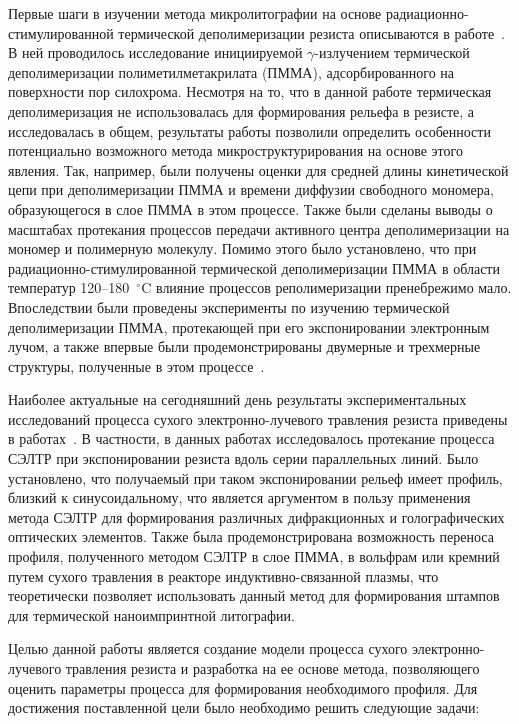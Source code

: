 \previouswork

Первые шаги в изучении метода микролитографии на основе радиационно-стимулированной термической деполимеризации резиста описываются в работе~\cite{Bruk_2000}.
В ней проводилось исследование инициируемой $\gamma$-излучением термической деполимеризации полиметилметакрилата (ПММА), адсорбированного на поверхности пор силохрома.
Несмотря на то, что в данной работе термическая деполимеризация не использовалась для формирования рельефа в резисте, а исследовалась в общем, результаты работы позволили определить особенности потенциально возможного метода микроструктурирования на основе этого явления.
Так, например, были получены оценки для средней длины кинетической цепи при деполимеризации ПММА и времени диффузии свободного мономера, образующегося в слое ПММА в этом процессе.
Также были сделаны выводы о масштабах протекания процессов передачи активного центра деполимеризации на мономер и полимерную молекулу.
Помимо этого было установлено, что при радиационно-стимулированной термической деполимеризации ПММА в области температур 120--180~$^\circ$C влияние процессов реполимеризации пренебрежимо мало.
Впоследствии были проведены эксперименты по изучению термической деполимеризации ПММА, протекающей при его экспонировании электронным лучом, а также впервые были продемонстрированы двумерные и трехмерные структуры, полученные в этом процессе~\cite{Bruk_2013}.

Наиболее актуальные на сегодняшний день результаты экспериментальных исследований процесса сухого электронно-лучевого травления резиста приведены в работах~\cite{Bruk_2015_co, Bruk_2016_mee}.
В частности, в данных работах исследовалось протекание процесса СЭЛТР при экспонировании резиста вдоль серии параллельных линий.
Было установлено, что получаемый при таком экспонировании рельеф имеет профиль, близкий к синусоидальному, что является аргументом в пользу применения метода СЭЛТР для формирования различных дифракционных и голографических оптических элементов.
Также была продемонстрирована возможность переноса профиля, полученного методом СЭЛТР в слое ПММА, в вольфрам или кремний путем сухого травления в реакторе индуктивно-связанной плазмы, что теоретически позволяет использовать данный метод для формирования штампов для термической наноимпринтной литографии.


\aimsandtasks
Целью данной работы является создание модели процесса сухого электронно-лучевого травления резиста и разработка на ее основе метода, позволяющего оценить параметры процесса для формирования необходимого профиля. Для достижения поставленной цели было необходимо решить следующие задачи:

